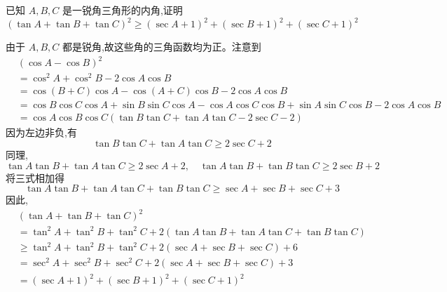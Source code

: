 \begin{questions}
    \question 已知 $A, B, C$ 是一锐角三角形的内角,证明
    \[
    (\tan A + \tan B + \tan C)^2 \ge (\sec A + 1)^2 + (\sec B + 1)^2 + (\sec C + 1)^2
    \]
    \begin{solution}
        由于 $A, B, C$ 都是锐角,故这些角的三角函数均为正。注意到
        \begin{align*}
        &(\cos A - \cos B)^2 \\
        &= \cos^2 A + \cos^2 B - 2 \cos A \cos B \\
        &= \cos(B+C)\cos A - \cos(A+C)\cos B - 2 \cos A \cos B \\
        &= \cos B \cos C \cos A + \sin B \sin C \cos A - \cos A \cos C \cos B + \sin A \sin C \cos B - 2 \cos A \cos B \\
        &= \cos A \cos B \cos C (\tan B \tan C + \tan A \tan C - 2 \sec C - 2)
        \end{align*}
        因为左边非负,有
        \[
        \tan B \tan C + \tan A \tan C \ge 2 \sec C + 2
        \]
        同理,
        \[
        \tan A \tan B + \tan A \tan C \ge 2 \sec A + 2, \quad
        \tan A \tan B + \tan B \tan C \ge 2 \sec B + 2
        \]
        将三式相加得
        \[
        \tan A \tan B + \tan A \tan C + \tan B \tan C \ge \sec A + \sec B + \sec C + 3
        \]
        因此,
        \begin{align*}
        &(\tan A + \tan B + \tan C)^2 \\
        &= \tan^2 A + \tan^2 B + \tan^2 C + 2(\tan A \tan B + \tan A \tan C + \tan B \tan C) \\
        &\ge \tan^2 A + \tan^2 B + \tan^2 C + 2(\sec A + \sec B + \sec C) + 6 \\
        &= \sec^2 A + \sec^2 B + \sec^2 C + 2(\sec A + \sec B + \sec C) + 3 \\
        &= (\sec A + 1)^2 + (\sec B + 1)^2 + (\sec C + 1)^2
        \end{align*}
    \end{solution}


\end{questions}
